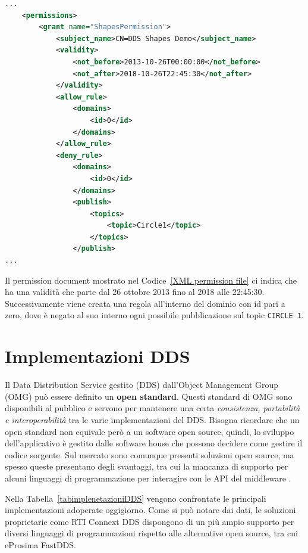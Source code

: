 \vspace{5mm} %
\begin{lstlisting}[language=XML, caption=Estratto di permissions
    document{,} tratto da documento di riferimento 
    del DDS Security versione 1.1 \cite{ddssecurity1.1}.
    , label=XML permission file,
    captionpos=b]
...
    <permissions>
        <grant name="ShapesPermission">
            <subject_name>CN=DDS Shapes Demo</subject_name>
            <validity>
                <not_before>2013-10-26T00:00:00</not_before>
                <not_after>2018-10-26T22:45:30</not_after>
            </validity>
            <allow_rule>
                <domains>
                    <id>0</id>
                </domains>
            </allow_rule>
            <deny_rule>
                <domains>
                    <id>0</id>
                </domains>
                <publish>
                    <topics>
                        <topic>Circle1</topic>
                    </topics>
                </publish>
...
    \end{lstlisting}
    \label{AccessControlServicePlugin}
\vspace{5mm}

Il permission document
mostrato nel Codice~\ref{XML permission file} 
ci indica che ha una validità che parte dal 26 ottobre 2013
fino al 2018 alle 22:45:30. Successivamente viene creata una 
regola all'interno del dominio con id pari a zero, dove è 
negato al suo interno ogni possibile pubblicazione sul topic
\texttt{CIRCLE 1}.


\section{Implementazioni DDS}
Il Data Distribution Service gestito (DDS) dall'Object Management
Group (OMG) può essere definito un \textbf{open standard}. Questi standard 
di OMG sono disponibili al pubblico e servono  
per mantenere una certa \textit{consistenza, portabilità e interoperabilità}
tra le varie implementazioni del DDS. Bisogna ricordare che un open 
standard non equivale però a un software open source, quindi, lo
sviluppo dell'applicativo è gestito dalle software house che possono 
decidere come gestire il codice sorgente. Sul mercato sono comunque 
presenti
soluzioni open source, ma spesso queste presentano degli svantaggi,
tra cui la mancanza di supporto per alcuni linguaggi di programmazione 
per interagire con le API del middleware
\cite{DDSimplementationRTI}.

Nella Tabella~\ref{tabimplenetazioniDDS} vengono confrontate
le principali implementazioni adoperate oggigiorno. 
Come si può notare dai dati,
le soluzioni proprietarie come RTI Connext DDS 
dispongono di un più ampio supporto per diversi linguaggi di 
programmazioni rispetto alle alternative open source, tra cui 
eProsima FastDDS.



